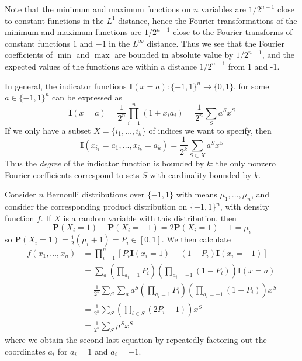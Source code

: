 Note that the minimum and maximum functions on $n$ variables are $1/2^{n-1}$ close to constant functions in the $L^1$ distance, hence the Fourier transformations of the minimum and maximum functions are $1/2^{n-1}$ close to the Fourier transforms of constant functions $1$ and $-1$ in the $L^\infty$ distance. Thus we see that the Fourier coefficients of $\min$ and $\max$ are bounded in absolute value by $1/2^{n-1}$, and the expected values of the functions are within a distance $1/2^{n-1}$ from 1 and -1.

\begin{example}
    In general, the indicator functions $\mathbf{I}(x = a): \{ -1, 1 \}^n \to \{ 0, 1 \}$, for some $a \in \{ -1, 1 \}^n$ can be expressed as
    \[ \mathbf{I}(x = a) = \frac{1}{2^n} \prod_{i = 1}^n \left( 1 + x_i a_i \right) = \frac{1}{2^n} \sum_S a^S x^S \]
    If we only have a subset $X = \{ i_1, \dots, i_k \}$ of indices we want to specify, then
    \[ \mathbf{I}(x_{i_1} = a_1, \dots, x_{i_k} = a_k) = \frac{1}{2^k} \sum_{S \subset X} a^S x^S \]
    Thus the {\it degree} of the indicator function is bounded by $k$: the only nonzero Fourier coefficients correspond to sets $S$ with cardinality bounded by $k$.
\end{example}

\begin{example}
    Consider $n$ Bernoulli distributions over $\{ -1, 1 \}$ with means $\mu_1, \dots, \mu_n$, and consider the corresponding product distribution on $\{ -1, 1 \}^n$, with density function $f$. If $X$ is a random variable with this distribution, then
    \[ \mathbf{P}(X_i = 1) - \mathbf{P}(X_i = -1) = 2 \mathbf{P}(X_i = 1) - 1 = \mu_i \]
    so $\mathbf{P}(X_i = 1) = \frac{1}{2} (\mu_i + 1) = P_i \in [0,1]$. We then calculate
    \begin{align*}
        f(x_1, \dots, x_n) &= \prod_{i = 1}^n \left[ P_i \mathbf{I}(x_i = 1) + (1 - P_i) \mathbf{I}(x_i = -1) \right]\\
        &= \sum_a \left( \prod_{a_i = 1} P_i \right) \left( \prod_{a_i = -1} (1 - P_i) \right) \mathbf{I}(x = a)\\
        &= \frac{1}{2^n} \sum_S \sum_a a^S \left( \prod_{a_i = 1} P_i \right) \left( \prod_{a_i = -1} (1 - P_i) \right) x^S\\
        &= \frac{1}{2^n} \sum_S \left( \prod_{i \in S} (2P_i - 1) \right) x^S\\
        &= \frac{1}{2^n} \sum_S \mu^S x^S
    \end{align*}
    where we obtain the second last equation by repeatedly factoring out the coordinates $a_i$ for $a_i = 1$ and $a_i = -1$.
\end{example}

